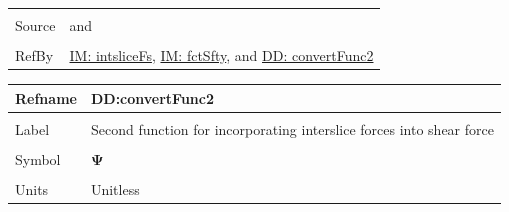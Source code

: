 \documentclass[12pt]{article}
\begin{document}
\begin{minipage}{\textwidth}
\begin{tabular}{>{\raggedright}p{}>{\raggedright\arraybackslash}p{}}
\\ \midrule \\
Source & \cite{chen2005} and \cite{karchewski2012}
         
\\ \midrule \\
RefBy & \hyperref[IM:intsliceFs]{IM: intsliceFs}, \hyperref[IM:fctSfty]{IM: fctSfty}, and \hyperref[DD:convertFunc2]{DD: convertFunc2}
        
\\ \bottomrule
\end{tabular}
\end{minipage}

\vspace{\baselineskip}
\noindent
\begin{minipage}{\textwidth}
\begin{tabular}{>{\raggedright}p{}>{\raggedright\arraybackslash}p{}}
\toprule \textbf{Refname} & \textbf{DD:convertFunc2}
\label{DD:convertFunc2}
\\ \midrule \\
Label & Second function for incorporating interslice forces into shear force
        
\\ \midrule \\
Symbol & $\mathbf{Ψ}$
         
\\ \midrule \\
Units & Unitless
        

\end{tabular}
\end{minipage}
\end{document}
